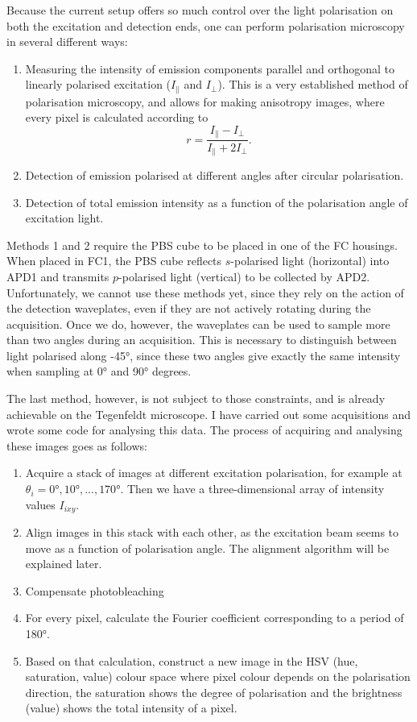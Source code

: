 Because the current setup offers so much control over the light polarisation on both the excitation and detection ends, one can perform polarisation microscopy in several different ways:
\begin{enumerate}
	\item Measuring the intensity of emission components parallel and orthogonal to linearly polarised excitation ($ I_\parallel $ and $ I_\perp $). This is a very established method of polarisation microscopy, and allows for making anisotropy images, where every pixel is calculated according to
	\begin{equation}
		r=\frac{I_\parallel - I_\perp}{I_\parallel + 2I_\perp}.
	\end{equation}
	
	\item Detection of emission polarised at different angles after circular polarisation.
	
	\item Detection of total emission intensity as a function of the polarisation angle of excitation light.
\end{enumerate}

Methods 1 and 2 require the PBS cube to be placed in one of the FC housings. When placed in FC1, the PBS cube reflects $ s $-polarised light (horizontal) into APD1 and transmits $ p $-polarised light (vertical) to be collected by APD2. Unfortunately, we cannot use these methods yet, since they rely on the action of the detection waveplates, even if they are not actively rotating during the acquisition. Once we do, however, the waveplates can be used to sample more than two angles during an acquisition. This is necessary to distinguish between light polarised along \ang{+-45}, since these two angles give exactly the same intensity when sampling at \ang{0} and \ang{90} degrees.

The last method, however, is not subject to those constraints, and is already achievable on the Tegenfeldt microscope. I have carried out some acquisitions and wrote some code for analysing this data. The process of acquiring and analysing these images goes as follows:
\begin{enumerate}
	\item Acquire a stack of images at different excitation polarisation, for example at $ \theta_i = \ang{0}, \ang{10}, ..., \ang{170}$. Then we have a three-dimensional array of intensity values $ I_{ixy} $.
	\item Align images in this stack with each other, as the excitation beam seems to move as a function of polarisation angle. The alignment algorithm will be explained later.
	\item Compensate photobleaching
	\item For every pixel, calculate the Fourier coefficient corresponding to a period of \ang{180}.
	\item Based on that calculation, construct a new image in the HSV (hue, saturation, value) colour space where pixel colour depends on the polarisation direction, the saturation shows the degree of polarisation and the brightness (value) shows the total intensity of a pixel. 

\end{enumerate}

